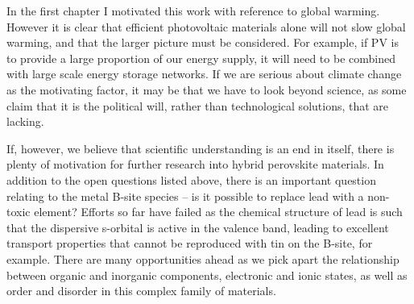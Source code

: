 In the first chapter I motivated this work with reference to global warming. However it is clear that efficient photovoltaic materials alone will not slow global warming, and that the larger picture must be considered. For example, if PV is to provide a large proportion of our energy supply, it will need to be combined with large scale energy storage networks. If we are serious about climate change as the motivating factor, it may be that we have to look beyond science, as some claim that it is the political will, rather than technological solutions, that are lacking. 

If, however, we believe that scientific understanding is an end in itself, there is plenty of motivation for further research into hybrid perovskite materials. In addition to the open questions listed above, there is an important question relating to the metal B-site species -- is it possible to replace lead with a non-toxic element? Efforts so far have failed as the chemical structure of lead is such that the dispersive s-orbital is active in the valence band, leading to excellent transport properties that cannot be reproduced with tin on the B-site, for example.
There are many opportunities ahead as we pick apart the relationship between organic and inorganic components, electronic and ionic states, as well as order and disorder in this complex family of materials.



